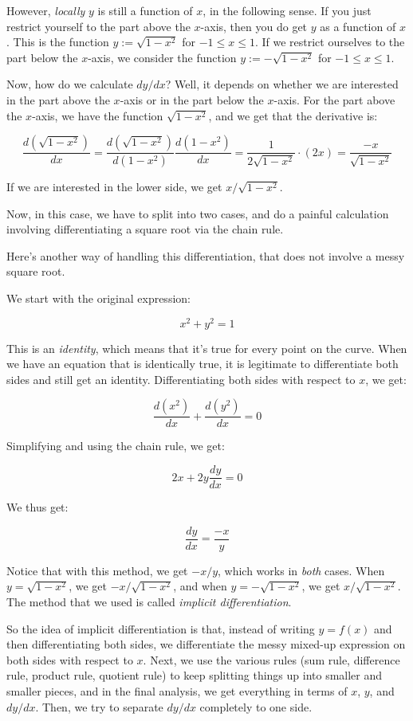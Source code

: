 \documentclass[10pt]{amsart}
\begin{document}
However, {\em locally} $y$ is still a function of $x$, in the
following sense. If you just restrict yourself to the part above the
$x$-axis, then you do get $y$ as a function of $x$. This is the
function $y := \sqrt{1 - x^2}$ for $-1 \le x \le 1$.  If we restrict
ourselves to the part below the $x$-axis, we consider the function $y
:= -\sqrt{1 - x^2}$ for $-1 \le x \le 1$.

Now, how do we calculate $dy/dx$? Well, it depends on whether we are
interested in the part above the $x$-axis or in the part below the
$x$-axis. For the part above the $x$-axis, we have the function
$\sqrt{1 - x^2}$, and we get that the derivative is:

$$\frac{d(\sqrt{1 - x^2})}{dx} = \frac{d(\sqrt{1 - x^2})}{d(1 - x^2)} \frac{d(1 - x^2)}{dx} = \frac{1}{2\sqrt{1 - x^2}} \cdot (2x) = \frac{-x}{\sqrt{1 - x^2}}$$

If we are interested in the lower side, we get $x/\sqrt{1 - x^2}$.

Now, in this case, we have to split into two cases, and do a painful
calculation involving differentiating a square root via the chain rule.

Here's another way of handling this differentiation, that does not
involve a messy square root.

We start with the original expression:

$$x^2 + y^2 = 1$$

This is an {\em identity}, which means that it's true for every point
on the curve. When we have an equation that is identically true, it is
legitimate to differentiate both sides and still get an
identity. Differentiating both sides with respect to $x$, we get:

$$\frac{d(x^2)}{dx} + \frac{d(y^2)}{dx} = 0$$

Simplifying and using the chain rule, we get:

$$2x + 2y\frac{dy}{dx} = 0$$

We thus get:

$$\frac{dy}{dx} = \frac{-x}{y}$$

Notice that with this method, we get $-x/y$, which works in {\em both}
cases. When $y = \sqrt{1 - x^2}$, we get $-x/\sqrt{1 - x^2}$, and when
$y = -\sqrt{1 - x^2}$, we get $x/\sqrt{1 - x^2}$. The method that we
used is called {\em implicit differentiation}.

So the idea of implicit differentiation is that, instead of writing $y
= f(x)$ and then differentiating both sides, we differentiate the
messy mixed-up expression on both sides with respect to $x$. Next, we
use the various rules (sum rule, difference rule, product rule,
quotient rule) to keep splitting things up into smaller and smaller
pieces, and in the final analysis, we get everything in terms of $x$,
$y$, and $dy/dx$. Then, we try to separate $dy/dx$ completely to one
side.
\end{document}
